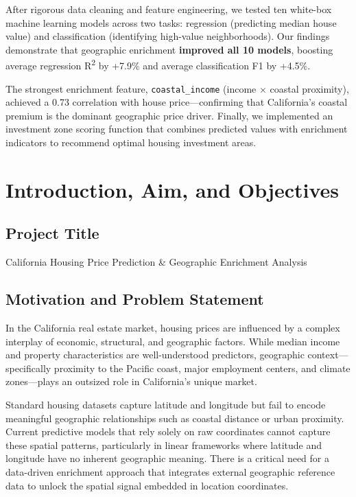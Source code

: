 \documentclass[12pt,a4paper]{article}
\begin{document}
After rigorous data cleaning and feature engineering, we tested ten white-box machine learning models across two tasks: regression (predicting median house value) and classification (identifying high-value neighborhoods). Our findings demonstrate that geographic enrichment \textbf{improved all 10 models}, boosting average regression R\textsuperscript{2} by +7.9\% and average classification F1 by +4.5\%.

The strongest enrichment feature, \texttt{coastal\_income} (income $\times$ coastal proximity), achieved a 0.73 correlation with house price---confirming that California's coastal premium is the dominant geographic price driver. Finally, we implemented an investment zone scoring function that combines predicted values with enrichment indicators to recommend optimal housing investment areas.

\newpage

\section{Introduction, Aim, and Objectives}

\subsection{Project Title}
California Housing Price Prediction \& Geographic Enrichment Analysis

\subsection{Motivation and Problem Statement}
In the California real estate market, housing prices are influenced by a complex interplay of economic, structural, and geographic factors. While median income and property characteristics are well-understood predictors, geographic context---specifically proximity to the Pacific coast, major employment centers, and climate zones---plays an outsized role in California's unique market.

Standard housing datasets capture latitude and longitude but fail to encode meaningful geographic relationships such as coastal distance or urban proximity. Current predictive models that rely solely on raw coordinates cannot capture these spatial patterns, particularly in linear frameworks where latitude and longitude have no inherent geographic meaning. There is a critical need for a data-driven enrichment approach that integrates external geographic reference data to unlock the spatial signal embedded in location coordinates.
\end{document}
